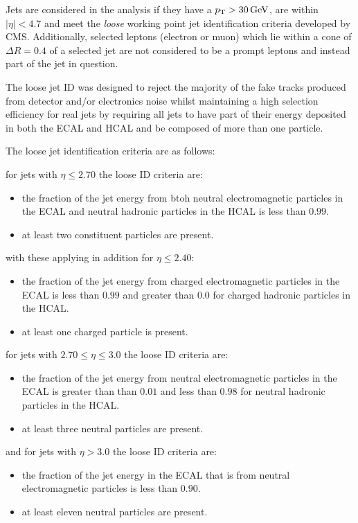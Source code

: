 Jets are considered in the analysis if they have a $p_{\mathrm{T}} > 30\,\text{Ge\hspace{-.08em}V}$, are within $|\eta| < 4.7$ and meet the \emph{loose} working point jet identification criteria developed by CMS.
Additionally, selected leptons (electron or muon) which lie within a cone of $\Delta R = 0.4$ of a selected jet are not considered to be a prompt leptons and instead part of the jet in question.

The loose jet ID was designed to reject the majority of the fake tracks produced from detector and/or electronics noise whilst maintaining a high selection efficiency for real jets by requiring all jets to have part of their energy deposited in both the ECAL and HCAL and be composed of more than one particle.

The loose jet identification criteria are as follows:

for jets with $\eta \leq 2.70$ the loose ID criteria are:
\begin{itemize}
\item the fraction of the jet energy from btoh neutral electromagnetic particles in the ECAL and neutral hadronic particles in the HCAL is less than $0.99$.
\item at least two constituent particles are present.
\end{itemize}

with these applying in addition for $\eta \leq 2.40$:
\begin{itemize}
\item the fraction of the jet energy from charged electromagnetic particles in the ECAL is less than $0.99$ and greater than 0.0 for charged hadronic particles in the HCAL.
\item at least one charged particle is present.
\end{itemize}


for jets with $ 2.70 \leq \eta \leq 3.0$ the loose ID criteria are:
\begin{itemize}
\item the fraction of the jet energy from neutral electromagnetic particles in the ECAL is greater than than $0.01$ and less than $0.98$ for neutral hadronic particles in the HCAL.
\item at least three neutral particles are present.
\end{itemize}

and for jets with $\eta > 3.0$ the loose ID criteria are:
\begin{itemize}
\item the fraction of the jet energy in the ECAL that is from neutral electromagnetic particles is less than $0.90$.
\item at least eleven neutral particles are present.
\end{itemize}

